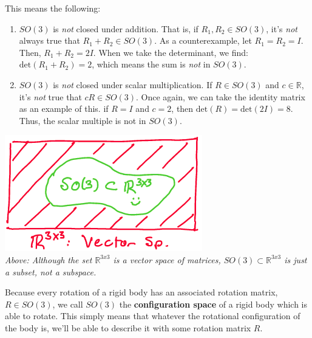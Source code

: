 \documentclass[oneside]{book}
\begin{document}
This means the following:
\begin{enumerate}
    \item $SO(3)$ is \textit{not} closed under addition. That is, if $R_1, R_2 \in SO(3)$, it's \textit{not} always true that $R_1 + R_2 \in SO(3)$. As a counterexample, let $R_1 = R_2 = I$. Then, $R_1+R_2 = 2I$. When we take the determinant, we find: $\mathrm{det}(R_1+R_2) = 2$, which means the sum is \textit{not} in $SO(3)$.
    \item $SO(3)$ is \textit{not} closed under scalar multiplication. If $R \in SO(3)$ and $c \in \mathbb{R}$, it's \textit{not} true that $cR \in SO(3)$. Once again, we can take the identity matrix as an example of this. if $R = I$ and $c = 2$, then $\mathrm{det}(R) = \mathrm{det}(2I) =8$. Thus, the scalar multiple is not in $SO(3)$.
\end{enumerate}
\begin{center}
    \includegraphics[scale=0.5]{images/so3r3x3.png}\\
    \textit{Above: Although the set $\mathbb{R}^{3x3}$ is a vector space of matrices, $SO(3) \subset \mathbb{R}^{3x3}$ is just a subset, not a subspace.}
\end{center}
Because every rotation of a rigid body has an associated rotation matrix, $R \in SO(3)$, we call $SO(3)$ the \textbf{configuration space} of a rigid body which is able to rotate. This simply means that whatever the rotational configuration of the body is, we'll be able to describe it with some rotation matrix $R$.
\end{document}
